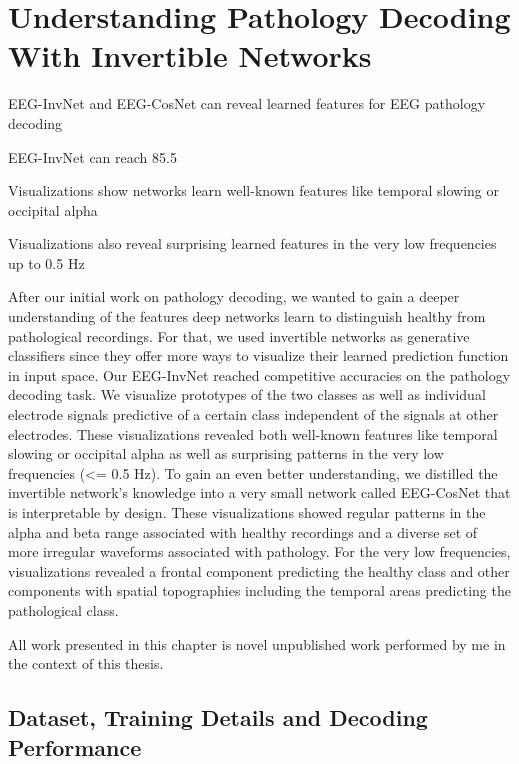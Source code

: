 \chapter{Understanding Pathology Decoding With
Invertible Networks}\label{understanding-pathology}
\vspace{2em}
\begin{startbox}{EEG-InvNet and EEG-CosNet can reveal learned features for EEG pathology decoding}
\item EEG-InvNet can reach 85.5%
\item Visualizations show networks learn well-known features like temporal slowing or occipital alpha
\item Visualizations also reveal surprising learned features in the very low frequencies up to 0.5 Hz
\end{startbox}


    After our initial work on pathology decoding, we wanted to gain a deeper
understanding of the features deep networks learn to distinguish healthy
from pathological recordings. For that, we used invertible networks as
generative classifiers since they offer more ways to visualize their
learned prediction function in input space. Our EEG-InvNet reached
competitive accuracies on the pathology decoding task. We visualize
prototypes of the two classes as well as individual electrode signals
predictive of a certain class independent of the signals at other
electrodes. These visualizations revealed both well-known features like
temporal slowing or occipital alpha as well as surprising patterns in
the very low frequencies (\textless= 0.5 Hz). To gain an even better
understanding, we distilled the invertible network's knowledge into a
very small network called EEG-CosNet that is interpretable by design.
These visualizations showed regular patterns in the alpha and beta range
associated with healthy recordings and a diverse set of more irregular
waveforms associated with pathology. For the very low frequencies,
visualizations revealed a frontal component predicting the healthy class
and other components with spatial topographies including the temporal
areas predicting the pathological class.

All work presented in this chapter is novel unpublished work performed
by me in the context of this thesis.

\section{Dataset, Training Details and Decoding
Performance}\label{dataset-training-details-and-decoding-performance}

